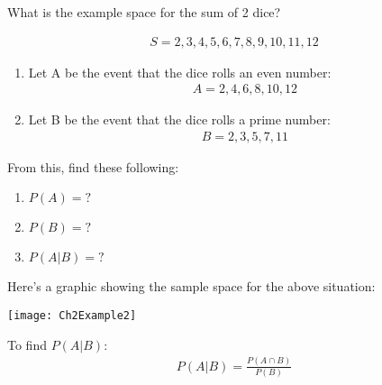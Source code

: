 \documentclass[../INDE315.tex]{subfiles}
\begin{document}
\begin{exmp}
    What is the example space for the sum of 2 dice?
\end{exmp}
\begin{equation*}
    \begin{aligned}
        S = {2,3,4,5,6,7,8,9,10,11,12}
    \end{aligned}
\end{equation*}
\begin{enumerate}
    \item Let A be the event that the dice rolls an even number:
        \begin{equation*}
            \begin{aligned}
                A = {2,4,6,8,10,12}
            \end{aligned}
        \end{equation*}
    \item Let B be the event that the dice rolls a prime number:
        \begin{equation*}
            \begin{aligned}
                B = {2,3,5,7,11}
            \end{aligned}
        \end{equation*}
\end{enumerate}
From this, find these following:
\begin{enumerate}
    \item $P(A) = ?$
    \item $P(B) = ?$ 
    \item $P(A|B) = ?$
\end{enumerate}

Here's a graphic showing the sample space for the above situation:
    \begin{center}
        \texttt{[image: Ch2Example2]}
    \end{center}
To find $P(A|B)$:
\begin{equation*}
    \begin{aligned}
        P(A|B) = \frac{P(A \cap B)}{P(B)}
    \end{aligned}
\end{equation*}
\end{document}
